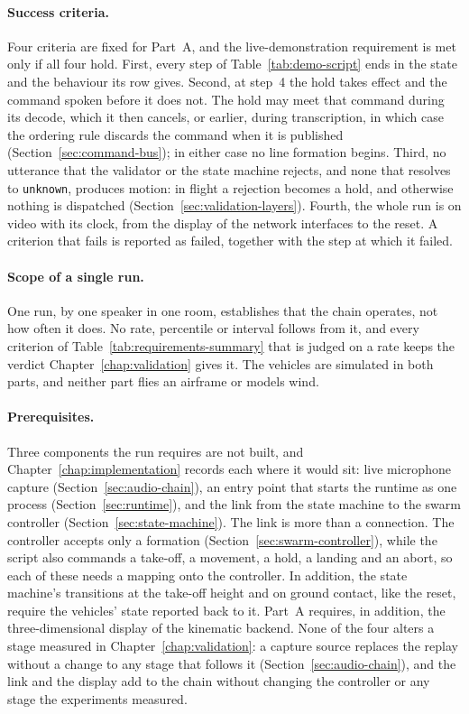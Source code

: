 \paragraph{Success criteria.} Four criteria are fixed for Part~A, and the live-demonstration
requirement is met only if all four hold. First, every step of Table~\ref{tab:demo-script} ends in
the state and the behaviour its row gives. Second, at step~4 the hold takes effect and the command
spoken before it does not. The hold may meet that command during its decode, which it then cancels,
or earlier, during transcription, in which case the ordering rule discards the command when it is
published (Section~\ref{sec:command-bus}); in either case no line formation begins. Third, no
utterance that the validator or the state machine rejects, and none that resolves to
\texttt{unknown}, produces motion: in flight a rejection becomes a hold, and otherwise nothing is
dispatched (Section~\ref{sec:validation-layers}). Fourth, the whole run is on video with its clock,
from the display of the network interfaces to the reset. A criterion that fails is reported as
failed, together with the step at which it failed.

\paragraph{Scope of a single run.} One run, by one speaker in one room, establishes that the
chain operates, not how often it does. No rate, percentile or interval follows from it, and every
criterion of Table~\ref{tab:requirements-summary} that is judged on a rate keeps the verdict
Chapter~\ref{chap:validation} gives it. The vehicles are simulated in both parts, and neither part
flies an airframe or models wind.

\paragraph{Prerequisites.} Three components the run requires are not built, and
Chapter~\ref{chap:implementation} records each where it would sit: live microphone capture
(Section~\ref{sec:audio-chain}), an entry point that starts the runtime as one process
(Section~\ref{sec:runtime}), and the link from the state machine to the swarm controller
(Section~\ref{sec:state-machine}). The link is more than a connection. The controller accepts only
a formation (Section~\ref{sec:swarm-controller}), while the script also commands a take-off, a
movement, a hold, a landing and an abort, so each of these needs a mapping onto the controller.
In addition, the state machine's transitions at the take-off height and on ground contact, like the reset,
require the vehicles' state reported back to it. Part~A requires, in addition, the three-dimensional display
of the kinematic backend. None of the four alters a stage measured in
Chapter~\ref{chap:validation}: a capture source replaces the replay without a change to any stage
that follows it (Section~\ref{sec:audio-chain}), and the link and the display add to the chain
without changing the controller or any stage the experiments measured.

